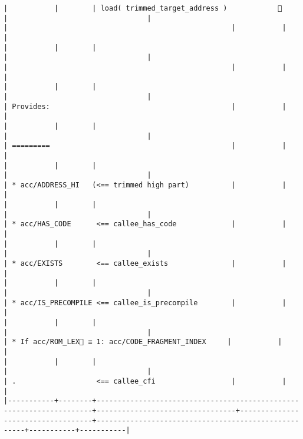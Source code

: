 \documentclass[varwidth=\maxdimen,margin=0.5cm,multi={verbatim}]{standalone}
\begin{document}
\begin{verbatim}
|           |        | load( trimmed_target_address )            👋                        |                                 |                                   |                                                     |           |           |
|           |        |                                                                     |                                 |                                   |                                                     |           |           |
|           |        |                                                                     |                                 |                                   | Provides:                                           |           |           |
|           |        |                                                                     |                                 |                                   | =========                                           |           |           |
|           |        |                                                                     |                                 |                                   | * acc/ADDRESS_HI   (<== trimmed high part)          |           |           |
|           |        |                                                                     |                                 |                                   | * acc/HAS_CODE      <== callee_has_code             |           |           |
|           |        |                                                                     |                                 |                                   | * acc/EXISTS        <== callee_exists               |           |           |
|           |        |                                                                     |                                 |                                   | * acc/IS_PRECOMPILE <== callee_is_precompile        |           |           |
|           |        |                                                                     |                                 |                                   | * If acc/ROM_LEX🚩 ≡ 1: acc/CODE_FRAGMENT_INDEX     |           |           |
|           |        |                                                                     |                                 |                                   | .                   <== callee_cfi                  |           |           |
|-----------+--------+---------------------------------------------------------------------+---------------------------------+-----------------------------------+-----------------------------------------------------+-----------+-----------|



\end{verbatim}
\end{document}
